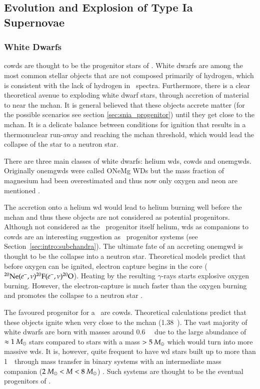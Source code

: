 \subsection{Evolution and Explosion of Type Ia Supernovae}

\subsubsection{White Dwarfs}
\label{sec:white_dwarfs}
\glspl{cowd} are thought to be the progenitor stars of \sneia. White dwarfs are among the most common stellar objects that are not composed primarily of hydrogen, which is consistent with the lack of hydrogen in \snia\ spectra. Furthermore, there is a clear theoretical avenue to exploding white dwarf stars, through accretion of material to near the \gls{mchan}. It is general believed that these objects accrete matter (for the possible scenarios see section \ref{sec:snia_progenitor}) until they get close to the \gls{mchan}. It is a delicate balance between conditions for ignition that results in a thermonuclear run-away and reaching the \gls{mchan} threshold, which would lead the collapse of the star to a neutron star.
 
There are three main classes of white dwarfs: helium \glspl{wd}, \glspl{cowd} and \glspl{onemgwd}. Originally \glspl{onemgwd} were called ONeMg WDs but the mass fraction of magnesium had been overestimated and thus now only oxygen and neon are mentioned \citep{1996ApJ...460..489R}. 

The accretion onto a helium \gls{wd} would lead to helium burning well before the \gls{mchan} and thus these objects are not considered as potential progenitors. Although not considered as the \snia\ progenitor itself helium, \glspl{wd} as companions to \glspl{cowd} are an interesting suggestion as \snia\ progenitor systems (see Section~\ref{sec:intro:subchandra}). The ultimate fate of an accreting \gls{onemgwd} is thought to be the collapse into a neutron star. Theoretical models predict that before oxygen can be ignited, electron capture begins in the core ($\Ne(e^-,\nu)\F[20](e^-,\nu)\Ox[20]$). Heating by the resulting $\gamma$-rays starts explosive oxygen burning. However, the electron-capture is much faster than the oxygen burning and promotes the collapse to a neutron star \citep{1991ApJ...367L..19N, 2005A&A...435..231G}. 

The favoured progenitor for a \snia\  are \glspl{cowd}. Theoretical calculations predict that these objects ignite when very close to the \gls{mchan} (1.38~\msun). The vast majority of white dwarfs are born with masses around 0.6~\msun\ \citep{2007MNRAS.375.1315K} due to the large abundance of  $\approx 1~\msun$ stars compared to stars with a mass $> 5~\msun$ which would turn into more massive \glspl{wd}.  It is, however, quite frequent to have \gls{wd} stars built up to more than 1~\msun\ through mass transfer in binary systems with an intermediate mass companion ($ 2~\msun < M < 8~\msun$) . Such systems are thought to be the eventual progenitors of \snia.

